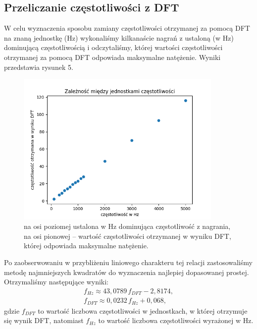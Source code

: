 \documentclass[polish]{article}
\begin{document}
\subsection{Przeliczanie częstotliwości z DFT}
W celu wyznaczenia sposobu zamiany częstotliwości otrzymanej za pomocą DFT na znaną jednostkę (Hz) wykonaliśmy kilkanaście nagrań z ustaloną (w Hz) dominującą częstotliwością i odczytaliśmy, której wartości częstotliwości otrzymanej za pomocą DFT odpowiada maksymalne natężenie. Wyniki przedstawia rysunek 5.
\begin{figure}[H]
	\centering
	\includegraphics[width=10cm]{przeliczanie_dft_hz}
	\caption{na osi poziomej ustalona w \unit{Hz} dominująca częstotliwość z nagrania, na osi pionowej -- wartość częstotliwości otrzymanej w wyniku DFT, której odpowiada maksymalne natężenie.}
\end{figure}
\noindent Po zaobserwowaniu w przybliżeniu liniowego charakteru tej relacji zastosowaliśmy metodę najmniejszych kwadratów do wyznaczenia najlepiej dopasowanej prostej. Otrzymaliśmy następujące wyniki:
\begin{gather*}
	f_{\unit{Hz}}\approx43,0789\,f_{\unit{DFT}}-2,8174,\\
	f_{\unit{DFT}}\approx0,0232\,f_{\unit{Hz}}+0,068,
\end{gather*}
gdzie $f_{\unit{DFT}}$ to wartość liczbowa częstotliwości w jednostkach, w której otrzymuje się wynik DFT, natomiast $f_{\unit{Hz}}$ to wartość liczbowa częstotliwości wyrażonej w \unit{Hz}.
\end{document}
